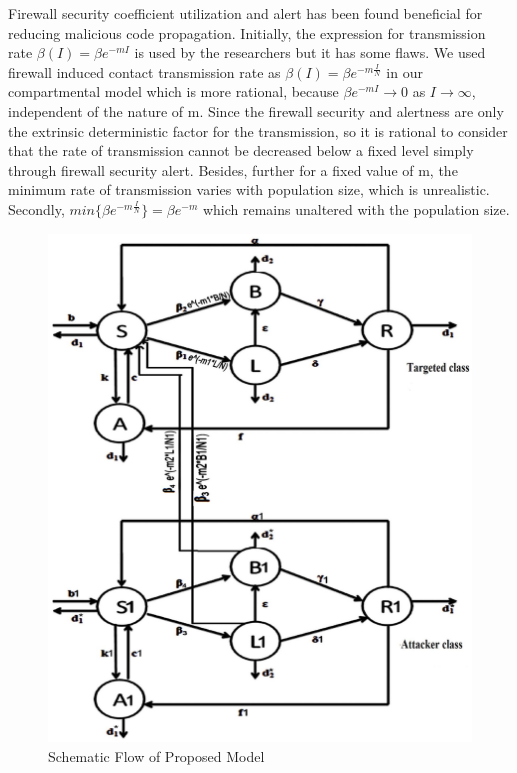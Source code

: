 Firewall security coefficient utilization and alert has been found beneficial for reducing malicious code propagation. Initially, the expression for transmission rate $\beta(I)=\beta e^{-mI}$ is used by the researchers but it has some flaws. We used firewall induced contact transmission rate as $\beta(I)=\beta e^{-m\frac{I}{N}}$ in our compartmental model which is more rational, because $\beta e^{-mI}\rightarrow 0$ as $I\rightarrow \infty$, independent of the nature of m. Since the firewall security and alertness are only the extrinsic deterministic factor for the transmission, so it is rational to consider that the rate of transmission cannot be decreased below a fixed level simply through firewall security alert. Besides, further for a fixed value of m, the minimum rate of transmission varies with population size, which is unrealistic. Secondly, $min\{\beta e^{-m\frac{I}{N}}\} = \beta e^{-m}$ which remains unaltered with the population size.


\newpage
\begin{figure}[h]
 \centering
  \centering
  \includegraphics[width=1\columnwidth, clip=true]{modelcopy1.eps}
  \caption{Schematic Flow of Proposed Model}\label{sf1}
 \end{figure}
\newpage

